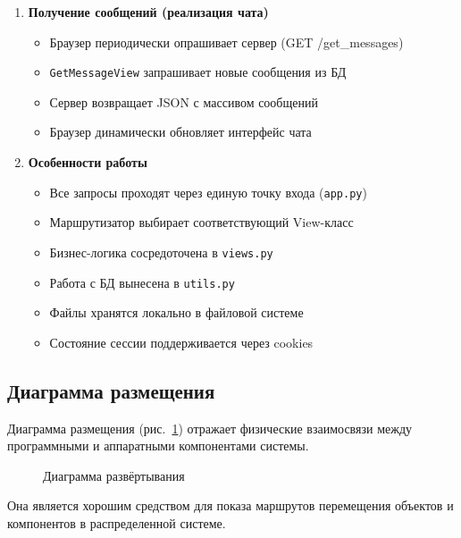 \begin{enumerate}[leftmargin=*,label=\textbf{\arabic*.}]
	\item \textbf{Получение сообщений (реализация чата)}
	\begin{itemize}
		\item Браузер периодически опрашивает сервер (GET /get\_messages)
		\item \texttt{GetMessageView} запрашивает новые сообщения из БД
		\item Сервер возвращает JSON с массивом сообщений
		\item Браузер динамически обновляет интерфейс чата
	\end{itemize}
	
	\item \textbf{Особенности работы}
	\begin{itemize}
		\item Все запросы проходят через единую точку входа (\texttt{app.py})
		\item Маршрутизатор выбирает соответствующий View-класс
		\item Бизнес-логика сосредоточена в \texttt{views.py}
		\item Работа с БД вынесена в \texttt{utils.py}
		\item Файлы хранятся локально в файловой системе
		\item Состояние сессии поддерживается через cookies
	\end{itemize}
\end{enumerate}

\subsection{Диаграмма размещения}

Диаграмма размещения (рис.~\ref{place:image}) отражает физические взаимосвязи между программными и аппаратными компонентами системы.

\begin{figure}[ht]
\caption{Диаграмма развёртывания}
\label{place:image}
\end{figure}

Она является хорошим средством для показа маршрутов перемещения объектов и компонентов в распределенной системе.

